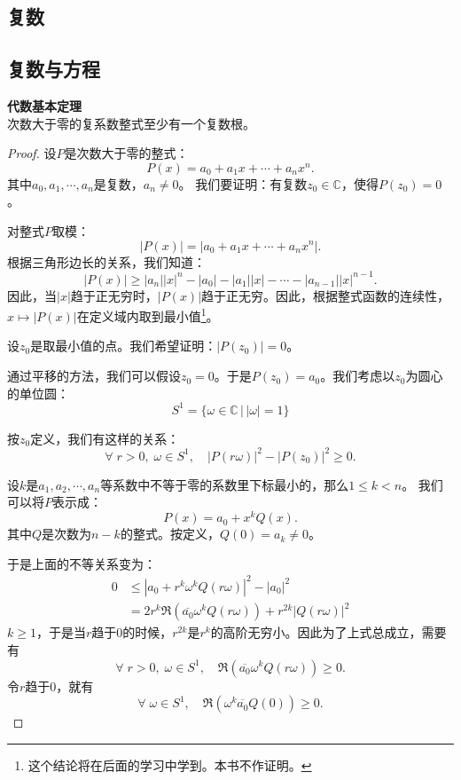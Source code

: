\documentclass[12pt,UTF8]{ctexbook}
\begin{document}
\begin{appendix}

\chapter{复数}

\section{复数与方程}

\begin{tm}{\textbf{代数基本定理}}
    \mbox{} \\
    次数大于零的复系数整式至少有一个复数根。
\end{tm}

\begin{proof}
    设$P$是次数大于零的整式：
    $$ P(x) = a_0 + a_1 x + \cdots + a_n x^n.$$
    其中$a_0, a_1, \cdots , a_n$是复数，$a_n \neq 0$。
    我们要证明：有复数$z_0\in\mathbb{C}$，使得$P(z_0) = 0$。

    对整式$P$取模：
    $$ |P(x)| = |a_0 + a_1 x + \cdots + a_n x^n|. $$
    根据三角形边长的关系，我们知道：
    $$ |P(x)| \geqslant |a_n| |x|^n - |a_0| - |a_1||x| - \cdots - |a_{n-1}| |x|^{n-1}. $$
    因此，当$|x|$趋于正无穷时，$|P(x)|$趋于正无穷。因此，根据整式函数的连续性，$x\mapsto |P(x)|$在定义域内取到最小值\footnote{这个结论将在后面的学习中学到。本书不作证明。}。

    设$z_0$是取最小值的点。我们希望证明：$|P(z_0)| = 0$。
    
    通过平移的方法，我们可以假设$z_0 = 0$。于是$P(z_0) = a_0$。我们考虑以$z_0$为圆心的单位圆：
    $$ S^1 = \{\omega\in\mathbb{C} \, | \, |\omega| = 1\}$$

    按$z_0$定义，我们有这样的关系：
    $$ \forall \; r > 0, \; \omega \in S^1,\quad  |P(r\omega)|^2 - |P(z_0)|^2 \geqslant 0. $$ 

    设$k$是$a_1, a_2, \cdots, a_n$等系数中不等于零的系数里下标最小的，那么$1\leqslant k < n$。
    我们可以将$P$表示成：
    $$ P(x) = a_0 + x^k Q(x). $$
    其中$Q$是次数为$n - k$的整式。按定义，$Q(0) = a_k \neq 0$。

    于是上面的不等关系变为：
    \begin{align*}
        0 &\leqslant |a_0 + r^k \omega^k Q(r\omega)|^2 - |a_0|^2 \\
          &= 2r^k \Re(\overline{a_0} \omega^k Q(r\omega)) + r^{2k}|Q(r\omega)|^2 
    \end{align*}
    $k\geqslant 1$，于是当$r$趋于$0$的时候，$r^{2k}$是$r^k$的高阶无穷小。因此为了上式总成立，需要有
    $$ \forall \; r > 0,\; \omega \in S^1,\quad \Re(\overline{a_0} \omega^k Q(r\omega)) \geqslant 0. $$
    令$r$趋于$0$，就有
    $$ \forall \; \omega \in S^1,\quad \Re(\omega^k\overline{a_0} Q(0)) \geqslant 0. $$


\end{proof}
\end{appendix}
\end{document}
